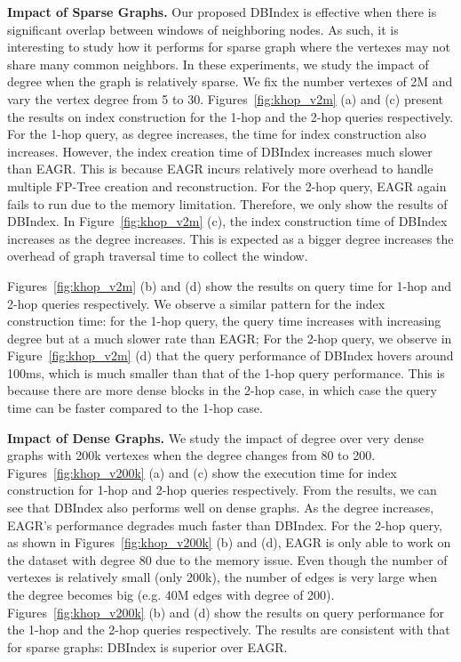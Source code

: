 \textbf{Impact of Sparse Graphs.} Our proposed DBIndex is effective when there is significant overlap between windows of neighboring nodes. As such, it is interesting to study how it performs for sparse graph where the vertexes may not share many common neighbors. In these experiments, 
we study the impact of degree when the graph is relatively sparse.
We fix the number vertexes of 2M and vary the vertex degree from 5 to 30. 
Figures~\ref{fig:khop_v2m} (a) and (c) present the results 
on index construction for the 1-hop and the 2-hop queries respectively. 
For the 1-hop query, as degree increases, the time for index
construction also increases. 
However, the index creation time of DBIndex increases much 
slower than EAGR. This is because EAGR incurs relatively more 
overhead to handle multiple FP-Tree creation and reconstruction. 
For the 2-hop query, EAGR again fails to run due to the memory limitation. %
Therefore, we only show the results of DBIndex. 
In Figure~\ref{fig:khop_v2m} (c), the index construction time of DBIndex increases as the 
degree increases. This is expected as a bigger degree  
increases the overhead of graph traversal time to collect the window. 


Figures~\ref{fig:khop_v2m} (b) and (d)
show the results on query time 
for 1-hop and 2-hop queries respectively. 
We observe a similar pattern for the index construction time:
for the 1-hop query, the query time increases with increasing degree
but at a much slower rate than EAGR; For the 2-hop query, we observe in Figure~\ref{fig:khop_v2m} (d) that the
query performance of DBIndex hovers around 100ms, which is much 
smaller than that of the 1-hop query performance. 
This is because there are more dense blocks in the 2-hop case, 
in which case the query time can be faster compared to the 1-hop case. 

\textbf{Impact of Dense Graphs.} We study the 
impact of degree over very dense graphs with 200k vertexes 
when the degree changes from 80 to 200. 
Figures~\ref{fig:khop_v200k} (a) and (c) show
the execution time for index construction 
for 1-hop and 2-hop queries respectively. From the results, 
we can see that DBIndex also performs well on dense graphs. 
As the degree increases, EAGR's performance degrades much faster than DBIndex. For the 2-hop query,
as shown in Figures~\ref{fig:khop_v200k} (b) and (d), EAGR is only able to work on 
the dataset with degree 80 due to the memory issue. 
Even though the number of vertexes is relatively small (only 200k), 
the number of edges is very large when the degree becomes big 
(e.g. 40M edges with degree of 200). 
%
Figures~\ref{fig:khop_v200k} 
(b) and (d) show the results on query performance 
for the 1-hop and the 2-hop queries respectively. 
The results are consistent with that for sparse graphs: DBIndex is superior over EAGR. 

